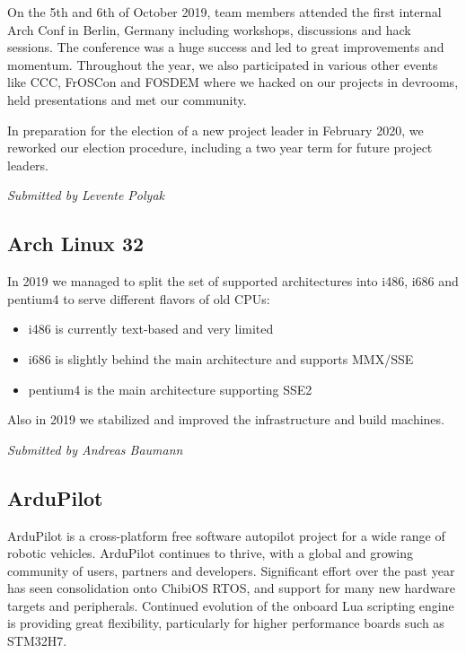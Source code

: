 \documentclass[a4paper]{report}
\begin{document}
On the 5th and 6th of October 2019, team members attended the first
internal Arch Conf in Berlin, Germany including workshops, discussions
and hack sessions. The conference was a huge success and led to great
improvements and momentum. Throughout the year, we also participated in
various other events like CCC, FrOSCon and FOSDEM where we hacked on our
projects in devrooms, held presentations and met our community.

In preparation for the election of a new project leader in February
2020, we reworked our election procedure, including a two year term for
future project leaders.

{\em Submitted by Levente Polyak}

\subsection{Arch Linux 32}

In 2019 we managed to split the set of supported architectures into
i486, i686 and pentium4 to serve different flavors of old CPUs:

\begin{itemize}

\item i486 is currently text-based and very limited
\item i686 is slightly behind the main architecture and supports MMX/SSE
\item pentium4 is the main architecture supporting SSE2

\end{itemize}

Also in 2019 we stabilized and improved the infrastructure and build
machines.

{\em Submitted by Andreas Baumann}

\subsection{ArduPilot}

ArduPilot is a cross-platform free software autopilot project for a wide
range of robotic vehicles. ArduPilot continues to thrive, with a global
and growing community of users, partners and developers. Significant
effort over the past year has seen consolidation onto ChibiOS RTOS, and
support for many new hardware targets and peripherals.  Continued
evolution of the onboard Lua scripting engine is providing great
flexibility, particularly for higher performance boards such as STM32H7.
\end{document}
